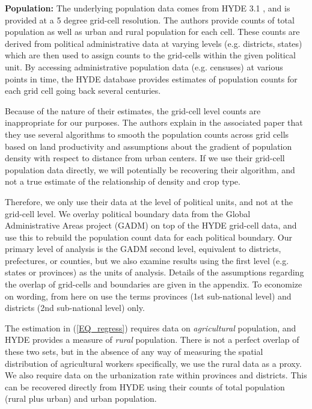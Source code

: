\documentclass[11pt]{article}
\begin{document}
\noindent\textbf{Population:} The underlying population data comes from HYDE 3.1 \citep{hyde31}, and is provided at a 5 degree grid-cell resolution. The authors provide counts of total population as well as urban and rural population for each cell. These counts are derived from political administrative data at varying levels (e.g. districts, states) which are then used to assign counts to the grid-cells within the given political unit. By accessing administrative population data (e.g. censuses) at various points in time, the HYDE database provides estimates of population counts for each grid cell going back several centuries.

Because of the nature of their estimates, the grid-cell level counts are inappropriate for our purposes. The authors explain in the associated paper that they use several algorithms to smooth the population counts across grid cells based on land productivity and assumptions about the gradient of population density with respect to distance from urban centers. If we use their grid-cell population data directly, we will potentially be recovering their algorithm, and not a true estimate of the relationship of density and crop type.

Therefore, we only use their data at the level of political units, and not at the grid-cell level. We overlay political boundary data from the Global Administrative Areas project (GADM) on top of the HYDE grid-cell data, and use this to rebuild the population count data for each political boundary. Our primary level of analysis is the GADM second level, equivalent to districts, prefectures, or counties, but we also examine results using the first level (e.g. states or provinces) as the units of analysis. Details of the assumptions regarding the overlap of grid-cells and boundaries are given in the appendix. To economize on wording, from here on use the terms provinces (1st sub-national level) and districts (2nd sub-national level) only.

The estimation in (\ref{EQ_regress}) requires data on \textit{agricultural} population, and HYDE provides a measure of \textit{rural} population. There is not a perfect overlap of these two sets, but in the absence of any way of measuring the spatial distribution of agricultural workers specifically, we use the rural data as a proxy. We also require data on the urbanization rate within provinces and districts. This can be recovered directly from HYDE using their counts of total population (rural plus urban) and urban population.
\end{document}
